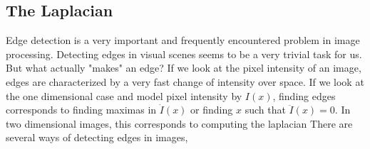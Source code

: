\documentclass[11pt,a4paper]{article}
\begin{document}
\subsection{The Laplacian}
Edge detection is a very important and frequently encountered problem in image processing. Detecting edges in visual scenes seems to be a very trivial task for us. But what actually "makes" an edge? If we look at the pixel intensity of an image, edges are characterized by a very fast change of intensity over space. If we look at the one dimensional case and model pixel intensity by $I(x)$, finding edges corresponds to finding maximas in $\dot{I}(x)$ or finding $x$ such that $\ddot{I}(x) = 0$. In two dimensional images, this corresponds to computing the laplacian
There are several ways of detecting edges in images,
\end{document}
